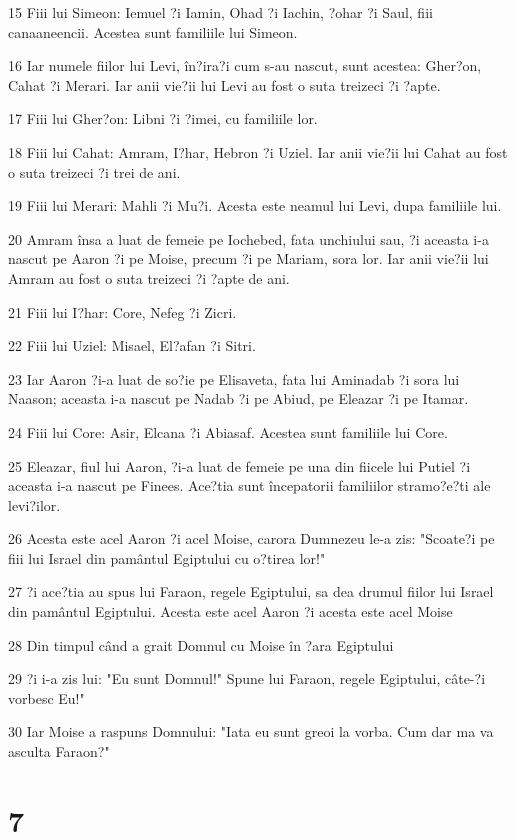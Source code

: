 \par 15 Fiii lui Simeon: Iemuel ?i Iamin, Ohad ?i Iachin, ?ohar ?i Saul, fiii canaaneencii. Acestea sunt familiile lui Simeon.
\par 16 Iar numele fiilor lui Levi, în?ira?i cum s-au nascut, sunt acestea: Gher?on, Cahat ?i Merari. Iar anii vie?ii lui Levi au fost o suta treizeci ?i ?apte.
\par 17 Fiii lui Gher?on: Libni ?i ?imei, cu familiile lor.
\par 18 Fiii lui Cahat: Amram, I?har, Hebron ?i Uziel. Iar anii vie?ii lui Cahat au fost o suta treizeci ?i trei de ani.
\par 19 Fiii lui Merari: Mahli ?i Mu?i. Acesta este neamul lui Levi, dupa familiile lui.
\par 20 Amram însa a luat de femeie pe Iochebed, fata unchiului sau, ?i aceasta i-a nascut pe Aaron ?i pe Moise, precum ?i pe Mariam, sora lor. Iar anii vie?ii lui Amram au fost o suta treizeci ?i ?apte de ani.
\par 21 Fiii lui I?har: Core, Nefeg ?i Zicri.
\par 22 Fiii lui Uziel: Misael, El?afan ?i Sitri.
\par 23 Iar Aaron ?i-a luat de so?ie pe Elisaveta, fata lui Aminadab ?i sora lui Naason; aceasta i-a nascut pe Nadab ?i pe Abiud, pe Eleazar ?i pe Itamar.
\par 24 Fiii lui Core: Asir, Elcana ?i Abiasaf. Acestea sunt familiile lui Core.
\par 25 Eleazar, fiul lui Aaron, ?i-a luat de femeie pe una din fiicele lui Putiel ?i aceasta i-a nascut pe Finees. Ace?tia sunt începatorii familiilor stramo?e?ti ale levi?ilor.
\par 26 Acesta este acel Aaron ?i acel Moise, carora Dumnezeu le-a zis: "Scoate?i pe fiii lui Israel din pamântul Egiptului cu o?tirea lor!"
\par 27 ?i ace?tia au spus lui Faraon, regele Egiptului, sa dea drumul fiilor lui Israel din pamântul Egiptului. Acesta este acel Aaron ?i acesta este acel Moise
\par 28 Din timpul când a grait Domnul cu Moise în ?ara Egiptului
\par 29 ?i i-a zis lui: "Eu sunt Domnul!" Spune lui Faraon, regele Egiptului, câte-?i vorbesc Eu!"
\par 30 Iar Moise a raspuns Domnului: "Iata eu sunt greoi la vorba. Cum dar ma va asculta Faraon?"

\chapter{7}


